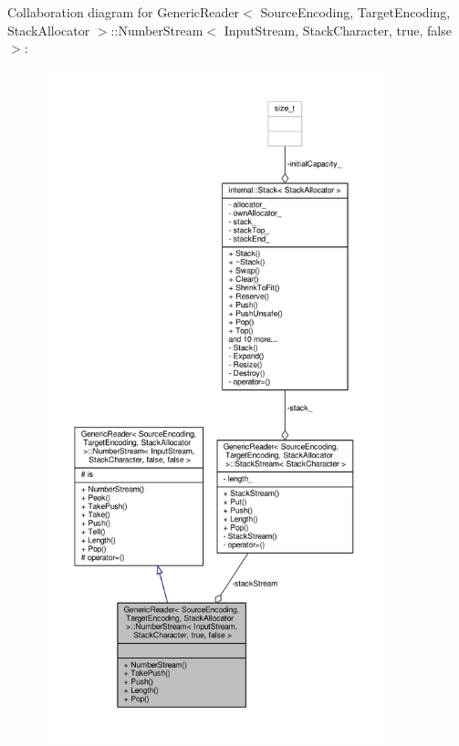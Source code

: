 Collaboration diagram for Generic\+Reader$<$ Source\+Encoding, Target\+Encoding, Stack\+Allocator $>$\+:\+:Number\+Stream$<$ Input\+Stream, Stack\+Character, true, false $>$\+:
\nopagebreak
\begin{figure}[H]
\begin{center}
\leavevmode
\includegraphics[height=550pt]{classGenericReader_1_1NumberStream_3_01InputStream_00_01StackCharacter_00_01true_00_01false_01_4__coll__graph}
\end{center}
\end{figure}
